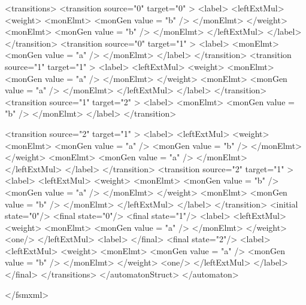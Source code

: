 \newpage

{\footnotesize
\begin{listingcont}
    <transitions>
      <transition  source="0"  target="0" >
        <label>
          <leftExtMul>
            <weight>
	      <monElmt>
		<monGen  value = "b" />
	      </monElmt>
            </weight>
            <monElmt>
              <monGen  value = "b" />
            </monElmt>
          </leftExtMul>
        </label>
      </transition>
      <transition  source="0"  target="1" >
        <label>
	  <monElmt>
	    <monGen  value = "a" />
	  </monElmt>
        </label>
      </transition>
      <transition  source="1"  target="1" >
        <label>
          <leftExtMul>
            <weight>
	      <monElmt>
		<monGen  value = "a" />
	      </monElmt>
            </weight>
            <monElmt>
              <monGen  value = "a" />
            </monElmt>
          </leftExtMul>
        </label>
      </transition>
      <transition  source="1"  target="2" >
        <label>
          <monElmt>
            <monGen  value = "b" />
          </monElmt>
        </label>
      </transition>
\end{listingcont}
}

\newpage
\enlargethispage*{2ex}
{\footnotesize
\begin{listingcont}
      <transition  source="2"  target="1" >
        <label>
          <leftExtMul>
            <weight>
	      <monElmt>
		<monGen  value = "a" />
		<monGen  value = "b" />
	      </monElmt>
            </weight>
            <monElmt>
              <monGen  value = "a" />
            </monElmt>
          </leftExtMul>
        </label>
      </transition>
      <transition  source="2"  target="1" >
        <label>
          <leftExtMul>
            <weight>
	      <monElmt>
		<monGen  value = "b" />
		<monGen  value = "a" />
	      </monElmt>
            </weight>
            <monElmt>
              <monGen  value = "b" />
            </monElmt>
          </leftExtMul>
        </label>
      </transition>
      <initial state="0"/>
      <final   state="0"/>
      <final   state="1"/>
	<label>
	  <leftExtMul>
	    <weight>
	      <monElmt>
		<monGen  value = "a" />
	      </monElmt>
	    </weight>
	    <one/>
	  </leftExtMul>
	<label>
      </final>
      <final   state="2"/>
	<label>
	  <leftExtMul>
	    <weight>
	      <monElmt>
		<monGen  value = "a" />
		<monGen  value = "b" />
	      </monElmt>
	    </weight>
	    <one/>
	  </leftExtMul>
	</label>
      </final>
    </transitions>
  </automatonStruct>
</automaton>

</fsmxml>
\end{listingcont}
}

\clearpage
